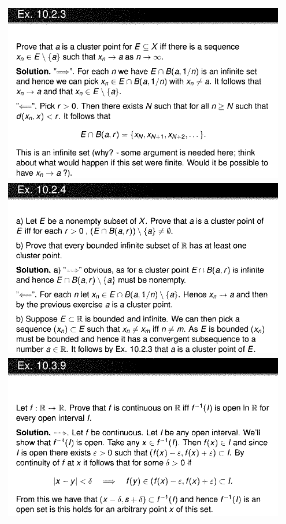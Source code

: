 \documentclass[8pt,landscape]{article}
\begin{document}
\begin{multicols}{3}
    \includegraphics[width=270]{Slides08.png} \\
    \includegraphics[width=270]{Slides09.png} \\
    \includegraphics[width=270]{Slides10.png} \\

\end{multicols}
\end{document}
